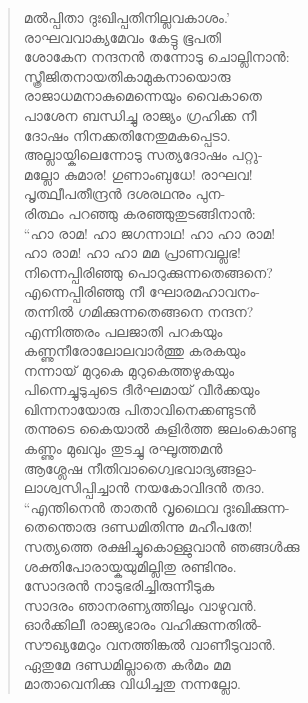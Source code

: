 \begin{verse}
മല്‍പ്പിതാ ദുഃഖിപ്പതിനില്ലവകാശം.’\\
രാഘവവാക്യമേവം കേട്ടു ഭൂപതി\\
ശോകേന നന്ദനന്‍ തന്നോടു ചൊല്ലിനാന്‍:\\
സ്ത്രീജിതനായതികാമുകനായൊരു\\
രാജാധമനാകുമെന്നെയും വൈകാതെ\\
പാശേന ബന്ധിച്ചു രാജ്യം ഗ്രഹിക്ക നീ\\
ദോഷം നിനക്കതിനേതുമകപ്പെടാ.\\
അല്ലായ്കിലെന്നോടു സത്യദോഷം പറ്റു-\\
മല്ലോ കുമാര! ഗുണാംബുധേ! രാഘവ!\\
പൃത്ഥ്വീപതീന്ദ്രന്‍ ദശരഥനും പുന-\\
രിത്ഥം പറഞ്ഞു കരഞ്ഞുതുടങ്ങിനാന്‍:\\
“ഹാ രാമ! ഹാ ജഗന്നാഥ! ഹാ ഹാ രാമ!\\
ഹാ രാമ! ഹാ ഹാ മമ പ്രാണവല്ലഭ!\\
നിന്നെപ്പിരിഞ്ഞു പൊറുക്കുന്നതെങ്ങനെ?\\
എന്നെപ്പിരിഞ്ഞു നീ ഘോരമഹാവനം-\\
തന്നില്‍ ഗമിക്കുന്നതെങ്ങനെ നന്ദന?\\
എന്നിത്തരം പലജാതി പറകയും\\
കണ്ണുനീരോലോലവാര്‍ത്തു കരകയും\\
നന്നായ് മുറുകെ മുറുകെത്തഴുകയും\\
പിന്നെച്ചുടുചുടെ ദീര്‍ഘമായ് വീര്‍ക്കയും\\
ഖിന്നനായോരു പിതാവിനെക്കണ്ടുടന്‍\\
തന്നുടെ കൈയാല്‍ കുളിര്‍ത്ത ജലംകൊണ്ടു\\
കണ്ണും മുഖവും തുടച്ചു രഘൂത്തമന്‍\\
ആശ്ലേഷ നീതിവാഗ്വൈഭവാദ്യങ്ങളാ-\\
ലാശ്വസിപ്പിച്ചാന്‍ നയകോവിദന്‍ തദാ.\\
“എന്തിനെന്‍ താതന്‍ വൃഥൈവ ദുഃഖിക്കുന്ന-\\
തെന്തൊരു ദണ്ഡമിതിന്നു മഹീപതേ!\\
സത്യത്തെ രക്ഷിച്ചുകൊള്ളുവാന്‍ ഞങ്ങള്‍ക്കു\\
ശക്തിപോരായ്കയുമില്ലിതു രണ്ടിനും.\\
സോദരന്‍ നാടുഭരിച്ചിരുന്നീടുക\\
സാദരം ഞാനരണ്യത്തിലും വാഴുവന്‍.\\
ഓര്‍ക്കിലീ രാജ്യഭാരം വഹിക്കുന്നതില്‍-\\
സൗഖ്യമേറും വനത്തിങ്കല്‍ വാണീടുവാന്‍.\\
ഏതുമേ ദണ്ഡമില്ലാതെ കര്‍മം മമ\\
മാതാവെനിക്കു വിധിച്ചതു നന്നല്ലോ.\\

\end{verse}
